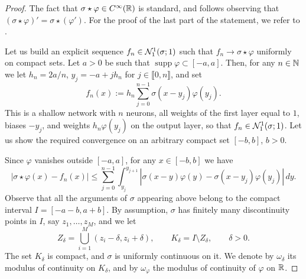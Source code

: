 
\begin{proof}
    The fact that $\sigma\star\varphi\in C^\infty(\mathbb{R})$ is standard, and follows observing that $(\sigma\star \varphi)'=\sigma\star (\varphi')$.
    For the proof of the last part of the statement, we refer to \cite[Lemma~3.15]{petersenMathematical2025}.

    Let us build an explicit sequence $f_n\in \mathcal{N}_1^1(\sigma;1)$ such that $f_n\rightarrow \sigma\star\varphi$ uniformly on compact sets. 
    Let $a>0$ be such that $\operatorname{supp}\varphi\subset[-a,a]$.  
    Then, for any $n\in \mathbb{N}$ we let $h_n = 2a/n$, $y_j=-a+j h_n$ for $j\in \llbracket0,n\rrbracket$, and set
    \begin{equation}
        f_n(x) := h_n \sum_{j=0}^{n-1} \sigma(x-y_j)\varphi(y_j).
    \end{equation}
    This is a shallow network with $n$ neurons, all weights of the first layer equal to $1$, biases $-y_j$, and weights $h_n\varphi(y_j)$ on the output layer, so that $f_n\in \mathcal{N}_1^1(\sigma;1)$. 
    Let us show the required convergence on an arbitrary compact set $[-b,b]$, $b>0$.
    
    Since $\varphi$ vanishes outside $[-a,a]$, for any $x\in [-b,b]$ we have 
    \begin{equation}
        \label{eq:stima1}
        |\sigma\star \varphi(x)-f_n(x)| \le
        \sum_{j=0}^{n-1}  \int_{y_j}^{y_{j+1}} \left| \sigma(x-y)\varphi(y)-\sigma(x-y_j)\varphi(y_j)\right|\, dy .
    \end{equation}
    Observe that all the arguments of $\sigma$ appearing above belong to the compact interval $I=[-a-b,a+b]$. 
    By assumption, $\sigma$ has finitely many discontinuity points in $I$, say $z_1,\ldots,z_M$, and we let 
    \begin{equation}
        Z_\delta = \bigcup_{i=1}^M (z_i-\delta,z_i+\delta), 
        \qquad 
        K_\delta = I\setminus Z_\delta,
        \qquad \delta>0.
    \end{equation}
    The set $K_\delta$ is compact, and $\sigma$ is uniformly continuous on it. We denote by $\omega_\delta$ its modulus of continuity on $K_\delta$, and by $\omega_\varphi$ the modulus of continuity of $\varphi$ on $\mathbb{R}$.
    

\end{proof}
